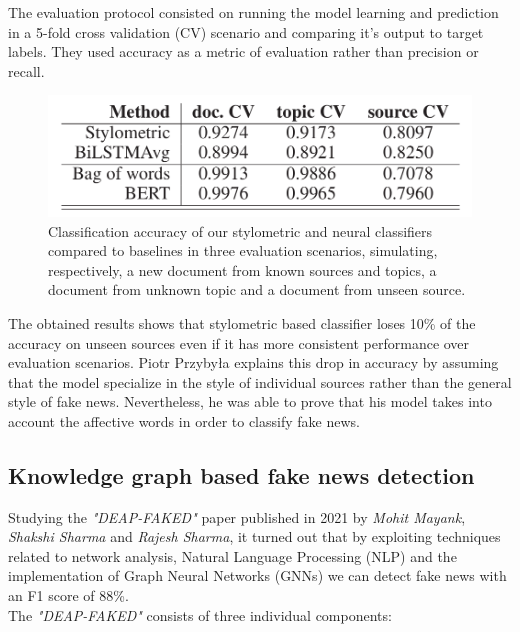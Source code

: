 \documentclass[conference]{IEEEtran}
\begin{document}
\begin{appendices}
The evaluation protocol consisted on running the model learning and prediction in a 5-fold cross validation (CV) scenario and comparing it's output to target labels. They used accuracy as a metric of evaluation rather than precision or recall.

\begin{figure}[htp]
	\centering
	\includegraphics[scale=0.3]{styled_model_result.png}
	\caption{Classiﬁcation accuracy of our stylometric and neural classiﬁers compared to baselines in three evaluation scenarios, simulating, respectively, a new document from known sources and topics, a document from unknown topic and a document from unseen source. \cite{przybyla2020capturing}}
\end{figure}

The obtained results shows that stylometric based classifier loses 10\% of the accuracy on unseen sources even if it has more consistent performance over evaluation scenarios. Piotr Przybyła explains this drop in accuracy by assuming that the model specialize in the style of individual sources rather than the general style of fake news. Nevertheless, he was able to prove that his model takes into account the affective words in order to classify fake news.
\subsection{Knowledge graph based fake news detection \cite{mayank2021deap} \cite{gad2019tracy}}
Studying the \textit{"DEAP-FAKED"} paper published in 2021 by \textit{Mohit Mayank}, \textit{Shakshi Sharma} and \textit{Rajesh Sharma}, it turned out that by exploiting techniques related to network analysis, Natural Language Processing (NLP) and the implementation of Graph Neural Networks (GNNs) we can detect fake news with an F1 score of 88\%.\\

The \textit{"DEAP-FAKED"} consists of three individual components:


\end{appendices}
\end{document}
